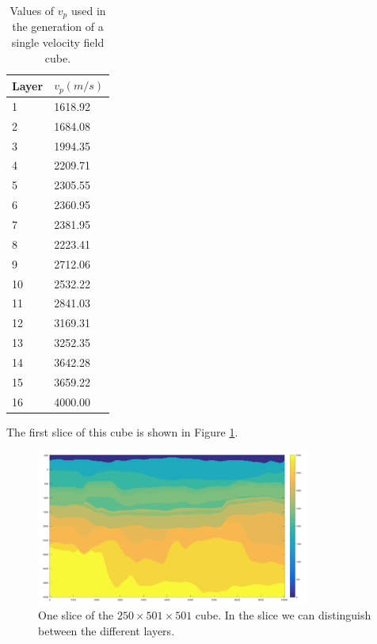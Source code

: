\begin{table}
\begin{center}
    \begin{tabular}{|l|l|}
    \hline
    \textbf{Layer} & $v_{p}(m/s)$ \\ \hline
    1     & 1618.92 \\ \hline
    2     & 1684.08 \\ \hline
    3     & 1994.35 \\ \hline
    4     & 2209.71 \\ \hline
    5     & 2305.55 \\ \hline
    6     & 2360.95 \\ \hline
    7     & 2381.95 \\ \hline
    8     & 2223.41 \\ \hline
    9     & 2712.06 \\ \hline
    10    & 2532.22 \\ \hline
    11    & 2841.03 \\ \hline
    12    & 3169.31 \\ \hline
    13    & 3252.35 \\ \hline
    14    & 3642.28 \\ \hline
    15    & 3659.22 \\ \hline
    16    & 4000.00 \\ \hline
    \end{tabular}
    \caption {Values of $v_{p}$ used in the generation of a single velocity field cube.}
    \label{tab:valuesOfVp}
    \end{center}
\end{table}

The first slice of this cube is shown in Figure \ref{fig:slice1}.

\begin{figure}[H]
    \centering
    \includegraphics[width=0.8\textwidth]{images/velocity_field.png}
    \caption{One slice of the $250\times501\times501$ cube. In the slice we can distinguish between the different layers.}
    \label{fig:slice1}
\end{figure}

